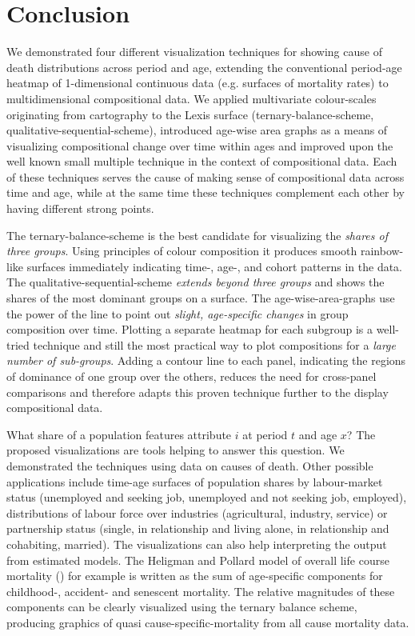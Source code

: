 \documentclass[a4paper]{scrartcl}
\begin{document}
\section*{Conclusion}

We demonstrated four different visualization techniques for showing cause of death distributions across period and age, extending the conventional period-age heatmap of 1-dimensional continuous data (e.g. surfaces of mortality rates) to multidimensional compositional data. We applied multivariate colour-scales originating from cartography to the Lexis surface (ternary-balance-scheme, qualitative-sequential-scheme), introduced age-wise area graphs as a means of visualizing compositional change over time within ages and improved upon the well known small multiple technique in the context of compositional data. Each of these techniques serves the cause of making sense of compositional data across time and age, while at the same time these techniques complement each other by having different strong points.

The ternary-balance-scheme is the best candidate for visualizing the \emph{shares of three groups}. Using principles of colour composition it produces smooth rainbow-like surfaces immediately indicating time-, age-, and cohort patterns in the data. The qualitative-sequential-scheme \emph{extends beyond three groups} and shows the shares of the most dominant groups on a surface. The age-wise-area-graphs use the power of the line to point out \emph{slight, age-specific changes} in group composition over time. Plotting a separate heatmap for each subgroup is a well-tried technique and still the most practical way to plot compositions for a \emph{large number of sub-groups}. Adding a contour line to each panel, indicating the regions of dominance of one group over the others, reduces the need for cross-panel comparisons and therefore adapts this proven technique further to the display compositional data.

What share of a population features attribute $i$ at period $t$ and age $x$? The proposed visualizations are tools helping to answer this question. We demonstrated the techniques using data on causes of death. Other possible applications include time-age surfaces of population shares by labour-market status (unemployed and seeking job, unemployed and not seeking job, employed), distributions of labour force over industries (agricultural, industry, service) or partnership status (single, in relationship and living alone, in relationship and cohabiting, married). The visualizations can also help interpreting the output from estimated models. The Heligman and Pollard model of overall life course mortality (\cite{Heligman1980}) for example is written as the sum of age-specific components for childhood-, accident- and senescent mortality. The relative magnitudes of these components can be clearly visualized using the ternary balance scheme, producing graphics of quasi cause-specific-mortality from all cause mortality data.
\end{document}
